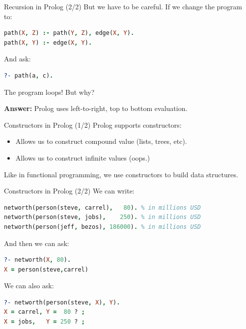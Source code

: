 \begin{frame}[fragile]{Recursion in Prolog (2/2)}
But we have to be careful. If we change the program to:

\begin{lstlisting}[language=prolog, xleftmargin=0.5cm]
path(X, Z) :- path(Y, Z), edge(X, Y).
path(X, Y) :- edge(X, Y).
\end{lstlisting}

\pause

And ask:

\begin{lstlisting}[language=prolog, xleftmargin=0.5cm]
?- path(a, c).
\end{lstlisting}

\pause

The program loops! But why?

\pause

\textbf{Answer:} Prolog uses left-to-right, top to bottom evaluation.
\end{frame}

\begin{frame}{Constructors in Prolog (1/2)}
Prolog supports constructors:

\begin{itemize}
    \item Allows us to construct compound value (lists, trees, etc).
    \item Allows us to construct infinite values (oops.)
\end{itemize}

Like in functional programming, we use constructors to build data structures.
\end{frame}

\begin{frame}[fragile]{Constructors in Prolog (2/2)}
We can write:

\begin{lstlisting}[language=prolog, xleftmargin=0.5cm]
networth(person(steve, carrel),   80). % in millions USD
networth(person(steve, jobs),    250). % in millions USD
networth(person(jeff, bezos), 186000). % in millions USD
\end{lstlisting}

\pause

And then we can ask:

\begin{lstlisting}[language=prolog, xleftmargin=0.5cm]
?- networth(X, 80).
X = person(steve,carrel)
\end{lstlisting}

\pause

We can also ask:

\begin{lstlisting}[language=prolog, xleftmargin=0.5cm]
?- networth(person(steve, X), Y).
X = carrel, Y =  80 ? ;
X = jobs,   Y = 250 ? ;
\end{lstlisting}
\end{frame}

